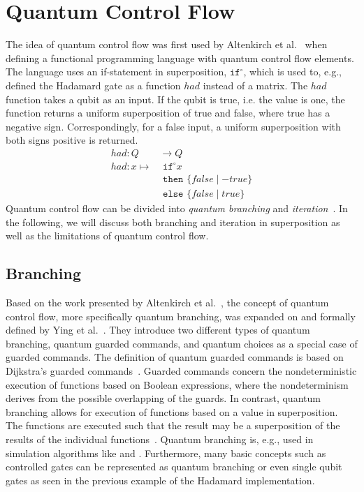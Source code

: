 \section{Quantum Control Flow}
\label{sec:background_quantumControlFlow}
The idea of quantum control flow was first used by Altenkirch et al.~\cite{AlGr05} when defining a functional programming language with quantum control flow elements. The language uses an if-statement in superposition, $\texttt{if}^\circ$, which is used to, e.g., defined the Hadamard gate as a function $had$ instead of a matrix. The $had$ function takes a qubit as an input. If the qubit is true, i.e. the value is one, the function returns a uniform superposition of true and false, where true has a negative sign. Correspondingly, for a false input, a uniform superposition with both signs positive is returned.
\begin{align*}
    had : Q& \to Q\\
    had : x \mapsto& \texttt{ if}^\circ x\\
                   & \texttt{ then } \{false \mid -true\}\\
                   & \texttt{ else } \{false \mid true\}
\end{align*}
Quantum control flow can be divided into \emph{quantum branching} and \emph{iteration}~\cite{YVC24}. In the following, we will discuss both branching and iteration in superposition as well as the limitations of quantum control flow. 

\subsection{Branching}
\label{sec:background_branching}
Based on the work presented by Altenkirch et al.~\cite{AlGr05}, the concept of quantum control flow, more specifically quantum branching, was expanded on and formally defined by Ying et al.~\cite{YYF12}. They introduce two different types of quantum branching, quantum guarded commands, and quantum choices as a special case of guarded commands. The definition of quantum guarded commands is based on Dijkstra's guarded commands~\cite{Dijk75}. Guarded commands concern the nondeterministic execution of functions based on Boolean expressions, where the nondeterminism derives from the possible overlapping of the guards. In contrast, quantum branching allows for execution of functions based on a value in superposition. The functions are executed such that the result may be a superposition of the results of the individual functions~\cite{YVC24}.
Quantum branching is, e.g., used in simulation algorithms like \cite{BGB*18} and \cite{LoCh19}. Furthermore, many basic concepts such as controlled gates can be represented as quantum branching or even single qubit gates as seen in the previous example of the Hadamard implementation.

